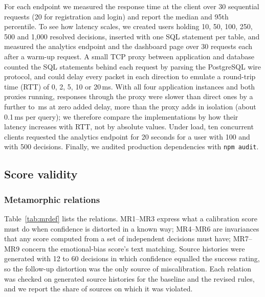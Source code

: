 \documentclass[12pt,a4paper]{article}
\begin{document}
For each endpoint we measured the response time at the client over 30 sequential requests (20 for registration and login) and report the median and 95th percentile. To see how latency scales, we created users holding 10, 50, 100, 250, 500 and 1,000 resolved decisions, inserted with one SQL statement per table, and measured the analytics endpoint and the dashboard page over 30 requests each after a warm-up request. A small TCP proxy between application and database counted the SQL statements behind each request by parsing the PostgreSQL wire protocol, and could delay every packet in each direction to emulate a round-trip time (RTT) of 0, 2, 5, 10 or 20\,ms. With all four application instances and both proxies running, responses through the proxy were slower than direct ones by a further \ProxyOffsetMin{} to \ProxyOffsetMax{}\,ms at zero added delay, more than the proxy adds in isolation (about 0.1\,ms per query); we therefore compare the implementations by how their latency increases with RTT, not by absolute values. Under load, ten concurrent clients requested the analytics endpoint for 20 seconds for a user with 100 and with 500 decisions. Finally, we audited production dependencies with \texttt{npm audit}.

\subsection{Score validity}

\subsubsection{Metamorphic relations}\label{sec:mr}

Table~\ref{tab:mrdef} lists the relations. MR1--MR3 express what a calibration score must do when confidence is distorted in a known way; MR4--MR6 are invariances that any score computed from a set of independent decisions must have; MR7--MR9 concern the emotional-bias score's text matching. Source histories were generated with 12 to 60 decisions in which confidence equalled the success rating, so the follow-up distortion was the only source of miscalibration. Each relation was checked on \MRSources{} generated source histories for the baseline and the revised rules, and we report the share of sources on which it was violated.
\end{document}
